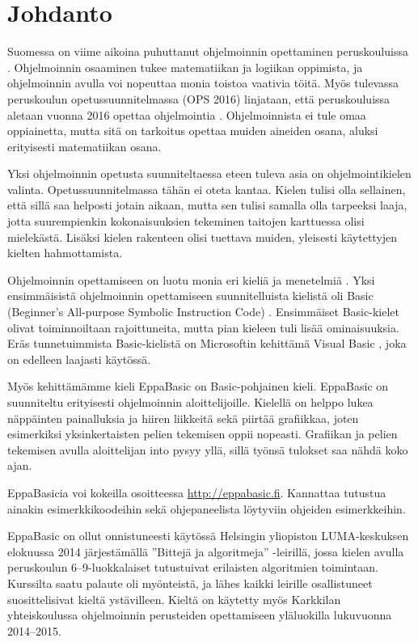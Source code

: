 
\section{Johdanto}
Suomessa on viime aikoina
puhuttanut ohjelmoinnin
opettaminen peruskouluissa
\cite{hs_kiuru}\cite{hs_eka}.
Ohjelmoinnin osaaminen
tukee matematiikan ja logiikan
oppimista, ja ohjelmoinnin
avulla voi nopeuttaa monia
toistoa vaativia töitä.
Myös tulevassa peruskoulun
opetussuunnitelmassa (OPS 2016)
linjataan, että peruskouluissa aletaan
vuonna 2016 opettaa ohjelmointia
\cite{OPS_2016}.
Ohjelmoinnista ei tule omaa oppiainetta,
mutta sitä on tarkoitus opettaa muiden
aineiden osana, aluksi erityisesti
matematiikan osana.

Yksi ohjelmoinnin opetusta suunniteltaessa eteen tuleva
asia on ohjelmointikielen valinta.
Opetussuunnitelmassa tähän ei
oteta kantaa.
Kielen tulisi olla sellainen,
että sillä saa helposti jotain aikaan,
mutta sen tulisi samalla olla tarpeeksi laaja,
jotta suurempienkin kokonaisuuksien tekeminen
taitojen karttuessa olisi mielekästä.
Lisäksi kielen rakenteen olisi tuettava muiden,
yleisesti käytettyjen kielten hahmottamista.

Ohjelmoinnin opettamiseen
on luotu monia eri kieliä ja menetelmiä
\cite{language_history}.
Yksi ensimmäisistä ohjelmoinnin opettamiseen
suunnitelluista kielistä oli Basic
(Beginner's All-purpose Symbolic Instruction Code)
\cite{basic}.
Ensimmäiset Basic-kielet olivat toiminnoiltaan rajoittuneita,
mutta pian kieleen tuli lisää ominaisuuksia.
Eräs tunnetuimmista Basic-kielistä on
Microsoftin kehittämä Visual Basic
\cite{vb.net},
joka on edelleen laajasti käytössä.

Myös kehittämämme kieli EppaBasic
on Basic-pohjainen kieli.
EppaBasic on suunniteltu
erityisesti ohjelmoinnin aloittelijoille.
Kielellä on helppo lukea
näppäinten painalluksia
ja hiiren liikkeitä
sekä piirtää grafiikkaa,
joten esimerkiksi yksinkertaisten
pelien tekemisen oppii nopeasti.
Grafiikan ja pelien tekemisen avulla
aloittelijan into pysyy yllä,
sillä työnsä tulokset saa nähdä koko ajan.

EppaBasicia voi kokeilla osoitteessa
\url{http://eppabasic.fi}.
Kannattaa tutustua ainakin esimerkkikoodeihin
sekä ohjepaneelista löytyviin
ohjeiden esimerkkeihin.

EppaBasic on ollut onnistuneesti käytössä
Helsingin yliopiston LUMA-keskuksen elokuussa 2014
järjestämällä ''Bittejä ja algoritmeja'' -leirillä,
jossa kielen avulla peruskoulun
6--9-luokkalaiset
tutustuivat erilaisten algoritmien toimintaan.
Kurssilta saatu palaute oli myönteistä,
ja lähes kaikki leirille osallistuneet
suosittelisivat kieltä ystävilleen.
Kieltä on käytetty myös Karkkilan yhteiskoulussa
ohjelmoinnin perusteiden opettamiseen yläluokilla
lukuvuonna 2014--2015.

